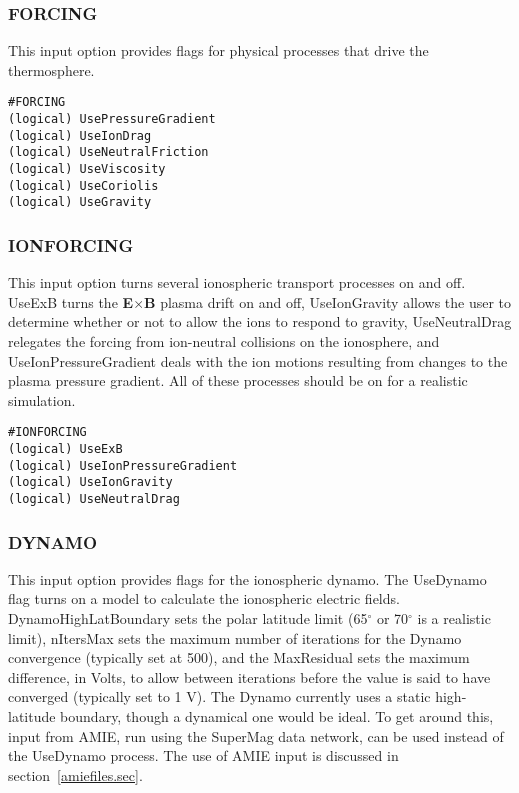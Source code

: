 \subsubsection{FORCING}
\label{forcing.sec}

This input option provides flags for physical processes that drive the thermosphere.

\begin{verbatim}
#FORCING
(logical) UsePressureGradient 
(logical) UseIonDrag          
(logical) UseNeutralFriction  
(logical) UseViscosity        
(logical) UseCoriolis         
(logical) UseGravity        
\end{verbatim}

\subsubsection{IONFORCING}
\label{ionforcing.sec}

This input option turns several ionospheric transport processes on and off.  UseExB turns the {\bf E}$\times${\bf B} plasma drift on and off, UseIonGravity allows the user to determine whether or not to allow the ions to respond to gravity, UseNeutralDrag relegates the forcing from ion-neutral collisions on the ionosphere, and UseIonPressureGradient deals with the ion motions resulting from changes to the plasma pressure gradient.  All of these processes should be on for a realistic simulation.

\begin{verbatim}
#IONFORCING
(logical) UseExB           
(logical) UseIonPressureGradient
(logical) UseIonGravity     
(logical) UseNeutralDrag   
\end{verbatim}

\subsubsection{DYNAMO}
\label{dynamo.sec}

This input option provides flags for the ionospheric dynamo.  The UseDynamo flag turns on a model to calculate the ionospheric electric fields.  DynamoHighLatBoundary sets the polar latitude limit (65$^\circ$ or 70$^\circ$ is a realistic limit), nItersMax sets the maximum number of iterations for the Dynamo convergence (typically set at 500), and the MaxResidual sets the maximum difference, in Volts, to allow between iterations before the value is said to have converged (typically set to 1 V).  The Dynamo currently uses a static high-latitude boundary, though a dynamical one would be ideal.  To get around this, input from AMIE, run using the SuperMag data network, can be used instead of the UseDynamo process.  The use of AMIE input is discussed in section~\ref{amiefiles.sec}.

